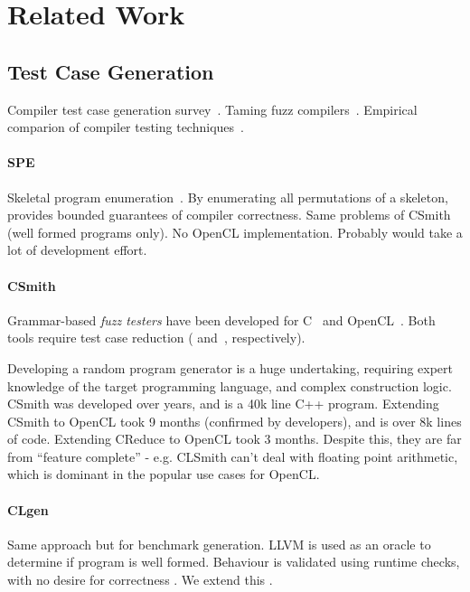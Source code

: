 \section{Related Work}\label{sec:rw}

\subsection{Test Case Generation}

 Compiler test case generation survey~\cite{Boujarwah1997}. Taming fuzz compilers~\cite{Chen2013}. Empirical comparion of compiler testing techniques~\cite{Chen2014a}.

\paragraph{SPE} Skeletal program enumeration~\cite{Zhang2016a}. By enumerating all permutations of a skeleton, provides bounded guarantees of compiler correctness. Same problems of CSmith (well formed programs only). No OpenCL implementation. Probably would take a lot of development effort. 

\paragraph{CSmith} Grammar-based \emph{fuzz testers} have been developed for C~\cite{Yang2011} and OpenCL~\cite{Lidbury2015a}. Both tools require test case reduction (\cite{Regehr2012a} and~\cite{Pflanzer2016}, respectively).

Developing a random program generator is a huge undertaking, requiring expert knowledge of the target programming language, and complex construction logic. CSmith was developed over years, and is a 40k line C++ program. Extending CSmith to OpenCL took 9 months (confirmed by developers), and is over 8k lines of code. Extending CReduce to OpenCL took 3 months. Despite this, they are far from ``feature complete'' - e.g. CLSmith can't deal with floating point arithmetic, which is dominant in the popular use cases for OpenCL.

\paragraph{CLgen} Same approach but for benchmark generation. LLVM is used as an oracle to determine if program is well formed. Behaviour is validated using runtime checks, with no desire for correctness \cite{Cummins2017a}. We extend this \cec{\ldots}.

